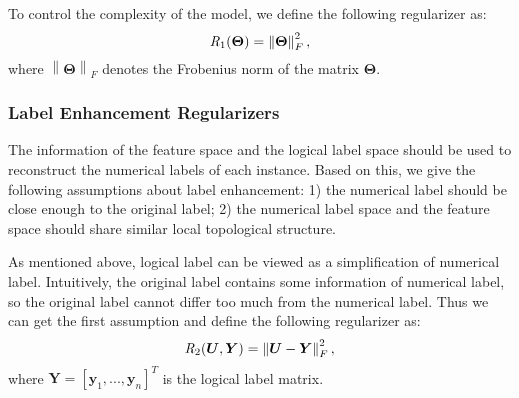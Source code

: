 \documentclass[conference]{IEEEtran}
\begin{document}
To control the complexity of the model, we define the following regularizer as:
\begin{equation}
\emph{R}_{1}(\bm{\Theta}) = \left\lVert \bm{\Theta} \right\rVert_F^2,
\end{equation}
where $\left\lVert \bm{\Theta} \right\rVert_F$ denotes the Frobenius norm of the matrix $\bm{\Theta}$.

\subsubsection{Label Enhancement Regularizers}
The information of the feature space and the logical label space should be used to reconstruct the numerical labels of each instance. Based on this, we give the following assumptions about label enhancement: 1) the numerical label should be close enough to the original label; 2) the numerical label space and the feature space should share similar local topological structure.

As mentioned above, logical label can be viewed as a simplification of numerical label. Intuitively, the original label contains some information of numerical label, so the original label cannot differ too much from the numerical label. Thus we can get the first assumption and define the following regularizer as:
\begin{equation}
\emph{R}_{2}(\bm{U}, \bm{Y}) = \left\lVert \bm{U} - \bm{Y} \right\rVert_F^2,
\end{equation}
where $\bm{Y}=[\bm{y}_1, ..., \bm{y}_n ]^T$ is the logical label matrix.
\end{document}
